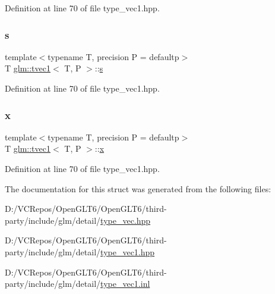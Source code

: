 Definition at line 70 of file type\+\_\+vec1.\+hpp.

\mbox{\label{structglm_1_1tvec1_a0b19a3746dcf46d86ed4953d4b8307e5}} 
\subsubsection{\texorpdfstring{s}{s}}
{\footnotesize\ttfamily template$<$typename T, precision P = defaultp$>$ \\
T \mbox{\hyperlink{structglm_1_1tvec1}{glm\+::tvec1}}$<$ T, P $>$\+::\mbox{\hyperlink{glad_8h_af1b1d5edfea6a34daee7389b1b5810ad}{s}}}



Definition at line 70 of file type\+\_\+vec1.\+hpp.

\mbox{\label{structglm_1_1tvec1_ad7a6121d82ab7692cbc8798aecdf07ee}} 
\subsubsection{\texorpdfstring{x}{x}}
{\footnotesize\ttfamily template$<$typename T, precision P = defaultp$>$ \\
T \mbox{\hyperlink{structglm_1_1tvec1}{glm\+::tvec1}}$<$ T, P $>$\+::\mbox{\hyperlink{glad_8h_a92d0386e5c19fb81ea88c9f99644ab1d}{x}}}



Definition at line 70 of file type\+\_\+vec1.\+hpp.



The documentation for this struct was generated from the following files\+:\begin{DoxyCompactItemize}
\item 
D\+:/\+V\+C\+Repos/\+Open\+G\+L\+T6/\+Open\+G\+L\+T6/third-\/party/include/glm/detail/\mbox{\hyperlink{type__vec_8hpp}{type\+\_\+vec.\+hpp}}\item 
D\+:/\+V\+C\+Repos/\+Open\+G\+L\+T6/\+Open\+G\+L\+T6/third-\/party/include/glm/detail/\mbox{\hyperlink{type__vec1_8hpp}{type\+\_\+vec1.\+hpp}}\item 
D\+:/\+V\+C\+Repos/\+Open\+G\+L\+T6/\+Open\+G\+L\+T6/third-\/party/include/glm/detail/\mbox{\hyperlink{type__vec1_8inl}{type\+\_\+vec1.\+inl}}\end{DoxyCompactItemize}
